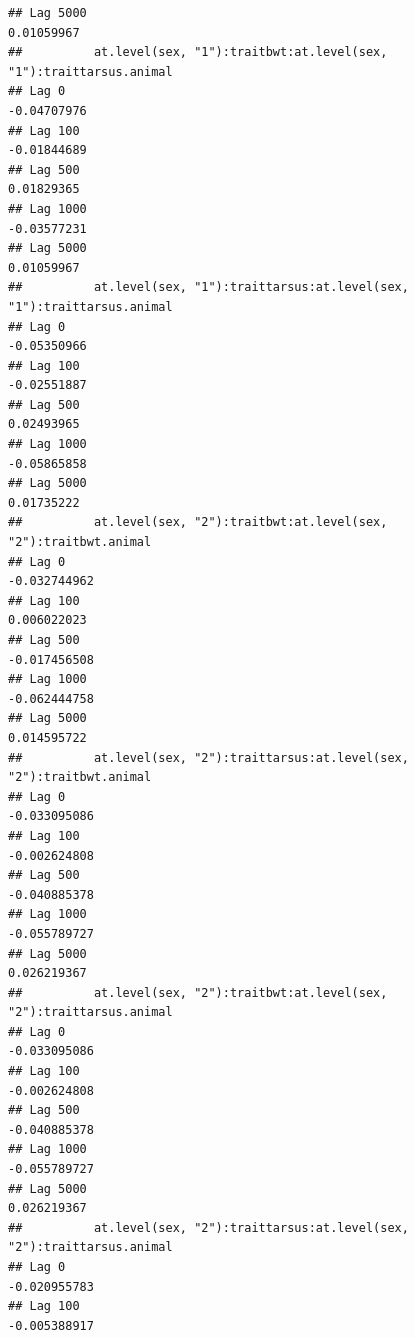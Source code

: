 \documentclass[
  12pt,
]{book}
\begin{document}
\begin{verbatim}
## Lag 5000                                                        0.01059967
##          at.level(sex, "1"):traitbwt:at.level(sex, "1"):traittarsus.animal
## Lag 0                                                          -0.04707976
## Lag 100                                                        -0.01844689
## Lag 500                                                         0.01829365
## Lag 1000                                                       -0.03577231
## Lag 5000                                                        0.01059967
##          at.level(sex, "1"):traittarsus:at.level(sex, "1"):traittarsus.animal
## Lag 0                                                             -0.05350966
## Lag 100                                                           -0.02551887
## Lag 500                                                            0.02493965
## Lag 1000                                                          -0.05865858
## Lag 5000                                                           0.01735222
##          at.level(sex, "2"):traitbwt:at.level(sex, "2"):traitbwt.animal
## Lag 0                                                      -0.032744962
## Lag 100                                                     0.006022023
## Lag 500                                                    -0.017456508
## Lag 1000                                                   -0.062444758
## Lag 5000                                                    0.014595722
##          at.level(sex, "2"):traittarsus:at.level(sex, "2"):traitbwt.animal
## Lag 0                                                         -0.033095086
## Lag 100                                                       -0.002624808
## Lag 500                                                       -0.040885378
## Lag 1000                                                      -0.055789727
## Lag 5000                                                       0.026219367
##          at.level(sex, "2"):traitbwt:at.level(sex, "2"):traittarsus.animal
## Lag 0                                                         -0.033095086
## Lag 100                                                       -0.002624808
## Lag 500                                                       -0.040885378
## Lag 1000                                                      -0.055789727
## Lag 5000                                                       0.026219367
##          at.level(sex, "2"):traittarsus:at.level(sex, "2"):traittarsus.animal
## Lag 0                                                            -0.020955783
## Lag 100                                                          -0.005388917

\end{verbatim}
\end{document}

